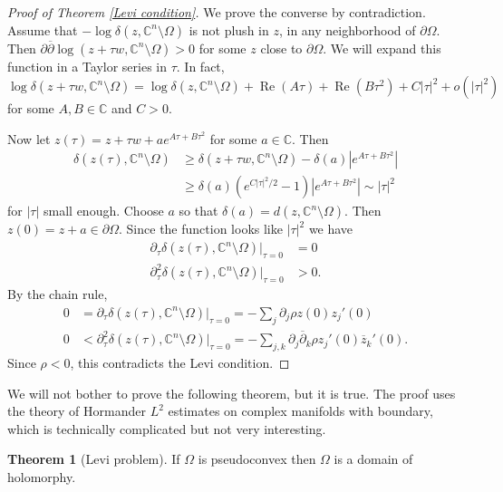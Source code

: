 \documentclass[12pt]{report}
\newcommand{\CC}{\mathbb{C}}
\newcommand{\dbar}{\overline\partial}
\renewcommand{\Re}{\operatorname{Re}}
\theoremstyle{definition}
\newtheorem{theorem}{Theorem}[chapter]
\begin{document}
\begin{proof}[Proof of Theorem \ref{Levi condition}]
    We prove the converse by contradiction. Assume that $-\log \delta(z, \CC^n \setminus \Omega)$ is not plush in $z$, in any neighborhood of $\partial \Omega$. Then $\partial \dbar \log(z + \tau w, \CC^n \setminus \Omega) > 0$ for some $z$ close to $\partial \Omega$. We will expand this function in a Taylor series in $\tau$. In fact,
    $$\log \delta(z + \tau w, \CC^n \setminus \Omega) = \log \delta(z, \CC^n \setminus \Omega) + \Re (A \tau) + \Re (B \tau^2) + C|\tau|^2 + o(|\tau|^2)$$
    for some $A, B \in \CC$ and $C > 0$.

    Now let $z(\tau) = z + \tau w + ae^{A\tau + B\tau^2}$ for some $a \in \CC$. Then
\begin{align*}
    \delta(z(\tau), \CC^n \setminus \Omega) &\geq \delta(z + \tau w, \CC^n \setminus \Omega) - \delta(a)|e^{A\tau + B\tau^2}|\\
    &\geq \delta(a) (e^{C|\tau|^2/2} - 1)|e^{A\tau + B\tau^2}| \sim |\tau|^2
\end{align*}
    for $|\tau|$ small enough. Choose $a$ so that $\delta(a) = d(z, \CC^n \setminus \Omega)$. Then $z(0) = z + a \in \partial \Omega$. Since the function looks like $|\tau|^2$ we have
\begin{align*}\partial_\tau \delta(z(\tau), \CC^n \setminus \Omega)|_{\tau = 0} &= 0\\
\partial_\tau^2 \delta(z(\tau), \CC^n \setminus \Omega)|_{\tau = 0} &> 0.
\end{align*}
    By the chain rule,
\begin{align*}
    0 &= \partial_\tau \delta(z(\tau), \CC^n \setminus \Omega)|_{\tau = 0} = -\sum_j \partial_j \rho z(0) z_j'(0)\\
    0 &< \partial_\tau^2 \delta(z(\tau), \CC^n \setminus \Omega)|_{\tau = 0} = -\sum_{j,k} \partial_j \dbar_k \rho z_j'(0) \overline z_k'(0).
\end{align*}
    Since $\rho < 0$, this contradicts the Levi condition.
\end{proof}
    We will not bother to prove the following theorem, but it is true. The proof uses the theory of Hormander $L^2$ estimates on complex manifolds with boundary, which is technically complicated but not very interesting.
\begin{theorem}[Levi problem]
    If $\Omega$ is pseudoconvex then $\Omega$ is a domain of holomorphy.
\end{theorem}
\end{document}
